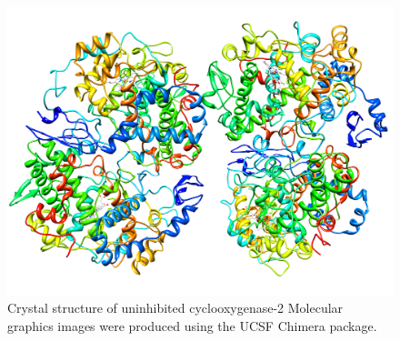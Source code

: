 \documentclass[12pt,letterpaper]{article}
\begin{document}
\begin{figure}[H]
\centering
\includegraphics[width = \textwidth]{GeneralSources/COX-2Image.png}
\caption{Crystal structure of uninhibited cyclooxygenase-2 Molecular graphics images were produced using the UCSF Chimera package\cite{Cox2WikiImage}.}
\end{figure}
\end{document}

